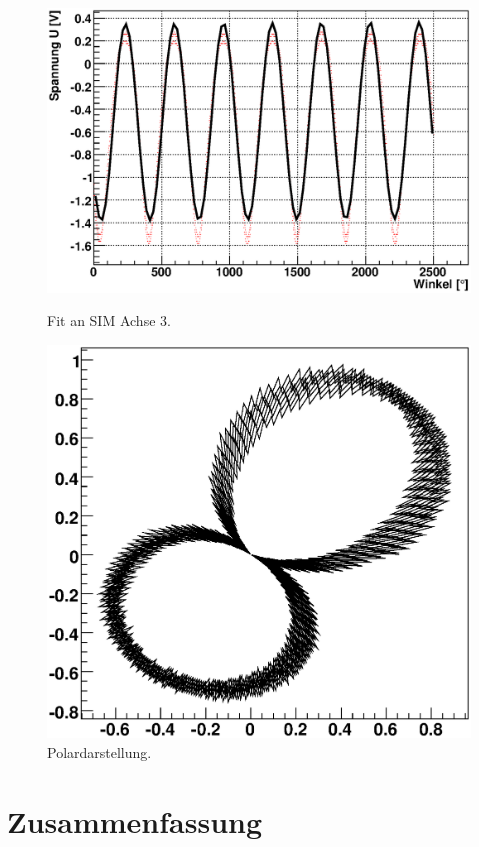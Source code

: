 \documentclass[12pt]{article}
\begin{document}
\begin{figure}[H]  
\begin{minipage}{0.49\linewidth}
\centering
\includegraphics[width=0.9\linewidth]{pictures/sim3.eps}
\caption{Fit an SIM Achse 3.}
\end{minipage}
\begin{minipage}{0.5\linewidth}
\centering 
\includegraphics[width=0.9\linewidth]{pictures/sim3vd.eps}
\caption{Polardarstellung.}
\end{minipage}
\end{figure}
\newpage

\section{Zusammenfassung}
\end{document}
